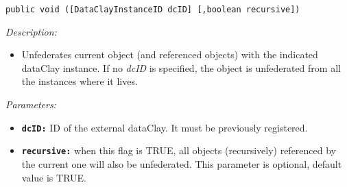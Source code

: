 \begin{dBox}

\texttt{public void ([DataClayInstanceID dcID] [,boolean recursive])}
\LINE

{\it Description:}

\begin{itemize}
  \item Unfederates current object (and referenced objects) with the indicated dataClay instance. If no \textit{dcID} is specified, the object is unfederated from all the instances where it lives.
\end{itemize}

{\it Parameters:}

\begin{itemize}
  \item \texttt{\bfseries dcID:} ID of the external dataClay. It must be previously registered.
  \item \texttt{\bfseries recursive:} when this flag is TRUE, all objects (recursively) referenced by the current one will also be unfederated. This parameter is optional, default value is TRUE.
\end{itemize}

\end{dBox}

